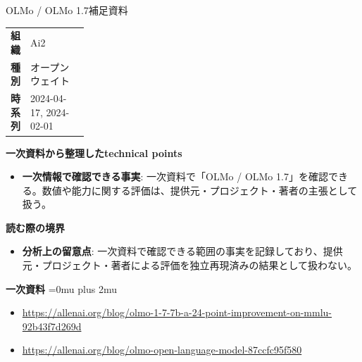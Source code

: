\begin{technicalnote}{OLMo / OLMo 1.7}{補足資料}
\begingroup
\begin{tabularx}{\linewidth}{@{}>{\bfseries}p{0.22\linewidth}X@{}}
組織 & Ai2 \\
種別 & オープンウェイト \\
時系列 & 2024-04-17, 2024-02-01 \\
\end{tabularx}
\smallskip
{\bfseries 一次資料から整理したtechnical points}
\begin{itemize}[leftmargin=1.5em,itemsep=0.35em]
\item \textbf{一次情報で確認できる事実}: 一次資料で「OLMo / OLMo 1.7」を確認できる。数値や能力に関する評価は、提供元・プロジェクト・著者の主張として扱う。
\end{itemize}
\begin{minipage}{\linewidth}
{\bfseries 読む際の境界}
\begin{itemize}[leftmargin=1.5em,itemsep=0.35em]
\item \textbf{分析上の留意点}: 一次資料で確認できる範囲の事実を記録しており、提供元・プロジェクト・著者による評価を独立再現済みの結果として扱わない。
\end{itemize}
\begin{samepage}
{\bfseries 一次資料}
\begingroup\sloppy
\Urlmuskip=0mu plus 2mu\relax
\begin{itemize}[leftmargin=1.5em,itemsep=0.25em]
\item {\scriptsize\url{https://allenai.org/blog/olmo-1-7-7b-a-24-point-improvement-on-mmlu-92b43f7d269d}}
\item {\scriptsize\url{https://allenai.org/blog/olmo-open-language-model-87ccfc95f580}}
\end{itemize}
\endgroup
\end{samepage}
\end{minipage}
\endgroup
\end{technicalnote}
\medskip
